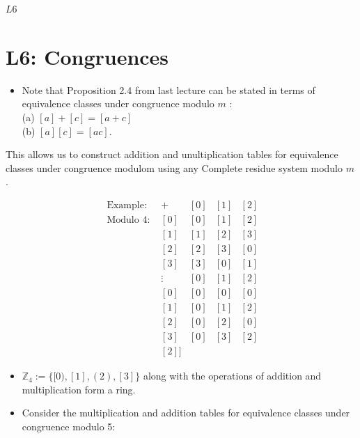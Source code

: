\documentclass[10pt]{article}
\begin{document}
$L 6$

\section*{L6: Congruences}
\begin{itemize}
  \item Note that Proposition 2.4 from last lecture can be stated in terms of equivalence classes under congruence modulo $m$ :\\
(a) $[a]+[c]=[a+c]$\\
(b) $[a][c]=[a c]$.
\end{itemize}

This allows us to construct addition and unultiplication tables for equivalence classes under congruence modulom using any Complete residue system modulo $m$.

$$
\begin{array}{ll|lll}
\text { Example: } & + & {[0]} & {[1]} & {[2]} \\
\hline \text { Modulo 4: } & {[0]} & {[0]} & {[1]} & {[2]} \\
& {[1]} & {[1]} & {[2]} & {[3]} \\
& {[2]} & {[2]} & {[3]} & {[0]} \\
& {[3]} & {[3]} & {[0]} & {[1]} \\
& \vdots & {[0]} & {[1]} & {[2]} \\
& {[0]} & {[0]} & {[0]} & {[0]} \\
& {[1]} & {[0]} & {[1]} & {[2]} \\
& {[2]} & {[0]} & {[2]} & {[0]} \\
& {[3]} & {[0]} & {[3]} & {[2]} \\
& [2]]
\end{array}
$$

\begin{itemize}
  \item $\mathbb{Z}_{4}:=\{[0),[1],(2),[3]\}$ along with the operations of addition and multiplication form a ring.
  \item Consider the multiplication and addition tables for equivalence classes under congruence modulo 5:
\end{itemize}
\end{document}
